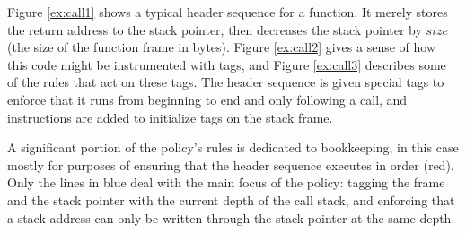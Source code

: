 \documentclass{report}
\begin{document}
Figure \ref{ex:call1} shows a typical header sequence for a function. It merely stores
the return address to the stack pointer, then decreases the stack pointer by \(size\)
(the size of the function frame in bytes). Figure \ref{ex:call2} gives a sense of how
this code might be instrumented with tags, and Figure \ref{ex:call3} describes some of
the rules that act on these tags. The header sequence is given special tags to enforce
that it runs from beginning to end and only following a call, and instructions are added
to initialize tags on the stack frame.

A significant portion of the policy's rules is dedicated to bookkeeping, in this case
mostly for purposes of ensuring that the header sequence executes in order (red).
Only the lines in blue deal with the main focus of the policy:
tagging the frame and the stack pointer with the current depth of the call stack, and enforcing
that a stack address can only be written through the stack pointer at the same depth.
\end{document}
